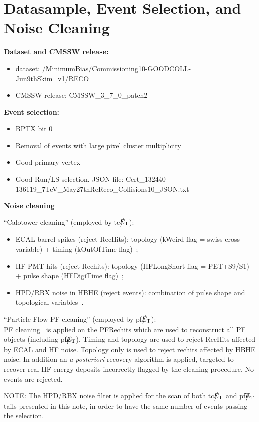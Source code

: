 \section{Datasample, Event Selection, and Noise Cleaning} \label{sec:EventSelection}

{\bf Dataset and CMSSW release:}
\begin{itemize}
\item dataset: /MinimumBias/Commissioning10-GOODCOLL-Jun9thSkim\_v1/RECO
\item CMSSW release: CMSSW\_3\_7\_0\_patch2
\end{itemize}

{\bf Event selection:}
\begin{itemize}
\item BPTX bit 0
\item Removal of events with large pixel cluster multiplicity
\item Good primary vertex
\item Good Run/LS selection. JSON file: Cert\_132440-136119\_7TeV\_May27thReReco\_Collisions10\_JSON.txt  
\end{itemize}

{\bf Noise cleaning}

``Calotower cleaning'' (employed by tc$\big\slash\hspace{-1.6ex}{E_\text{T}}$):
\begin{itemize}
\item ECAL barrel spikes (reject RecHits): topology (kWeird flag = swiss cross variable) + timing (kOutOfTime flag)~\cite{ECALAt7TeV};
\item HF PMT hits (reject Rechits): topology (HFLongShort flag = PET+S9/S1) + pulse shape (HFDigiTime flag)~\cite{HFDN};
\item HPD/RBX noise in HBHE (reject events): combination of pulse shape and topological variables~\cite{HCALWGNOTE}.
\end{itemize}

``Particle-Flow PF cleaning'' (employed by pf$\big\slash\hspace{-1.6ex}{E_\text{T}}$): \\
PF cleaning~\cite{PFPAS2010} is applied on the PFRechits which are used to reconstruct all PF objects (including pf$\big\slash\hspace{-1.6ex}{E_\text{T}}$).
Timing and topology are used to reject RecHits affected by ECAL and HF noise. Topology only is used to reject rechits affected 
by HBHE noise. In addition an {\it a posteriori} recovery algorithm is applied, targeted to recover real HF energy deposits 
incorrectly flagged by the cleaning procedure. No events are rejected.

NOTE: The HPD/RBX noise filter is applied for the scan of both tc$\big\slash\hspace{-1.6ex}{E_\text{T}}$ and pf$\big\slash\hspace{-1.6ex}{E_\text{T}}$ tails presented in this note, 
in order to have the same number of events passing the selection.


